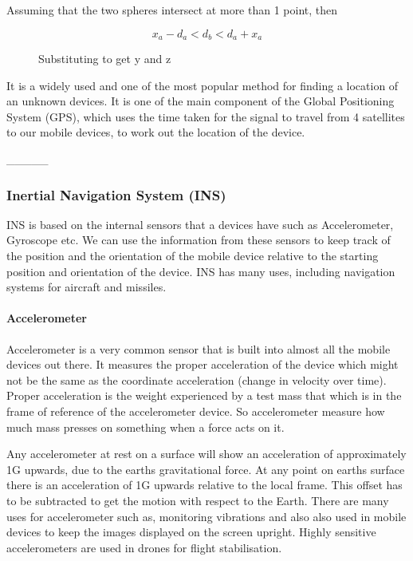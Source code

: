 Assuming that the two spheres intersect at more than 1 point, then 

\[
x_{a}-d_{a}<d_{b}<d_{a}+x_{a}
\]


\begin{figure}[H]
\protect\caption{Substituting to get y and z}


\end{figure}


It is a widely used and one of the most popular method for finding
a location of an unknown devices. It is one of the main component
of the Global Positioning System (GPS), which uses the time taken
for the signal to travel from 4 satellites to our mobile devices,
to work out the location of the device.

\_\_\_\_\_ 


\subsubsection{Inertial Navigation System (INS)}

INS\cite{innertial_nav_sys} is based on the internal sensors that a devices have
such as Accelerometer, Gyroscope etc. We can use the information from
these sensors to keep track of the position and the orientation of
the mobile device relative to the starting position and orientation
of the device. INS has many uses, including navigation systems for
aircraft and missiles\cite{ins-wiki}.


\paragraph{Accelerometer} \label{accelerometer}

Accelerometer\cite{accl-guide} is a very common sensor that is built into almost
all the mobile devices out there. It measures the proper acceleration
of the device which might not be the same as the coordinate acceleration
(change in velocity over time). Proper acceleration is the weight
experienced by a test mass that which is in the frame of reference
of the accelerometer device. So accelerometer measure how much mass
presses on something when a force acts on it.

Any accelerometer at rest on a surface will show an acceleration of
approximately 1G upwards\cite{accl-wiki}, due to the earths gravitational force. At
any point on earths surface there is an acceleration of 1G upwards
relative to the local frame. This offset has to be subtracted to get
the motion with respect to the Earth. There are many uses for accelerometer such as,
monitoring vibrations and also also used in mobile devices to
keep the images displayed on the screen upright. Highly sensitive
accelerometers are used in drones for flight stabilisation.

